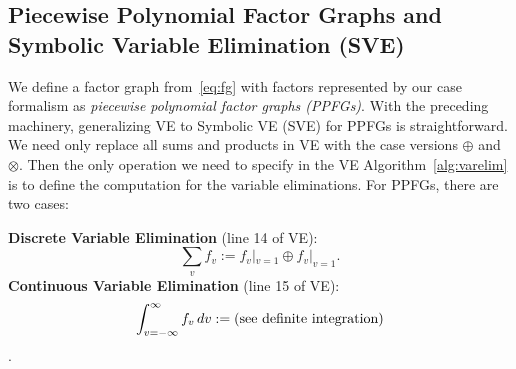 \documentclass[letterpaper]{article}
\renewcommand{\-}{\text{-}}
\begin{document}
{%





%


\subsection{Piecewise Polynomial Factor Graphs and Symbolic Variable Elimination (SVE)}

We define a factor graph from~\eqref{eq:fg} with factors represented
by our case formalism as \emph{piecewise polynomial factor graphs
(PPFGs)}.  
With the preceding machinery, generalizing VE to Symbolic VE (SVE) for
PPFGs is straightforward.  We need only replace all sums and products
in VE with the case versions $\oplus$ and $\otimes$.  Then the only
operation we need to specify in the VE Algorithm~\ref{alg:varelim} is
to define the computation for the variable
eliminations.  For PPFGs, there are two cases:

\vspace{2mm}
{\bf Discrete Variable Elimination} (line 14 of VE):\\
\vspace{-3mm}
$$\sum_v f_v := f_v|_{v=1} \oplus f_v|_{v=1}.$$
\vspace{-2mm}
{\bf Continuous Variable Elimination} (line 15 of VE):\\ 
$$\int_{v=-\infty}^{\infty} f_v \, dv := \mbox{(see definite integration)}$$.

}
\end{document}
